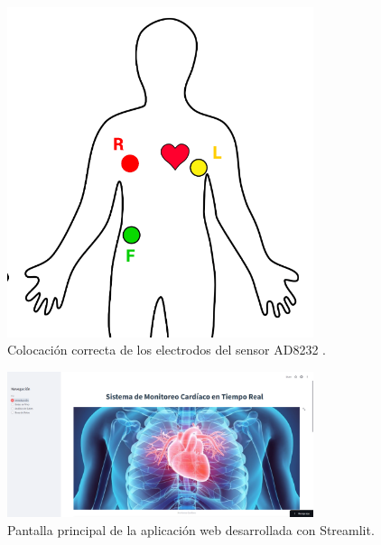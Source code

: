 \begin{figure}[h]
    \centering
    \includegraphics[width=0.8\textwidth]{img/electrodosreal.png}
    \caption{Colocación correcta de los electrodos del sensor AD8232 \cite{electrodos}.}
    \label{fig:electrodosreal}
\end{figure}


\begin{figure}[h]
    \centering
    \includegraphics[width=0.8\textwidth]{img/interfaz_streamlit.png}
    \caption{Pantalla principal de la aplicación web desarrollada con Streamlit.}
    \label{fig:streamlit_main}
\end{figure}

